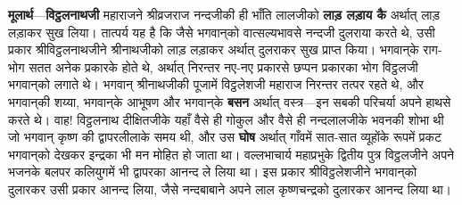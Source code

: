 \begin{sloppypar}\justifying{}
\textbf{मूलार्थ}—\textbf{विट्ठलनाथजी} महाराजने श्रीव्रजराज नन्दजीकी ही भाँति लालजीको \textbf{लाड़ लड़ाय कै} अर्थात् लाड़ लड़ाकर सुख लिया। तात्पर्य यह है कि जैसे भगवान्‌को वात्सल्यभावसे नन्दजी दुलराया करते थे, उसी प्रकार श्रीविट्ठलनाथजीने श्रीनाथजीको लाड़ लड़ाकर अर्थात् दुलराकर सुख प्राप्त किया। भगवान्‌के राग-भोग सतत अनेक प्रकारके होते थे, अर्थात् निरन्तर नए-नए प्रकारसे छप्पन प्रकारका भोग विट्ठलजी भगवान्‌को लगाते थे। भगवान् श्रीनाथजीकी पूजामें विट्ठलेशजी महाराज निरन्तर तत्पर रहते थे, और भगवान्‌की शय्या, भगवान्‌के आभूषण और भगवान्‌के \textbf{बसन} अर्थात् वस्त्र—इन सबकी परिचर्या अपने हाथसे करते थे। वाह! विट्ठलनाथ दीक्षितजीके यहाँ वैसे ही गोकुल और वैसे ही नन्दलालजीके भवनकी शोभा थी जो भगवान् कृष्ण की द्वापर\-लीलाके समय थी, और उस \textbf{घोष} अर्थात् गाँवमें सात-सात व्यूहोंके रूपमें प्रकट भगवान्‌को देखकर इन्द्रका भी मन मोहित हो जाता था। वल्लभाचार्य महाप्रभुके द्वितीय पुत्र विट्ठलजीने अपने भजनके बलपर कलियुगमें भी द्वापरका आनन्द ले लिया था। इस प्रकार श्रीविट्ठलेशजीने भगवान्‌को दुलारकर उसी प्रकार आनन्द लिया, जैसे नन्दबाबाने अपने लाल कृष्ण\-चन्द्रको दुलारकर आनन्द लिया था।
\end{sloppypar}


